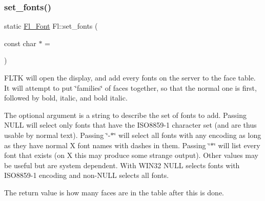 \subsubsection{\texorpdfstring{set\+\_\+fonts()}{set\_fonts()}}
{\footnotesize\ttfamily static \hyperlink{_enumerations_8_h_a2ac46d9f082834b969fffe490a03a709}{Fl\+\_\+\+Font} Fl\+::set\+\_\+fonts (\begin{DoxyParamCaption}\item[{const char $\ast$}]{ = {} }\end{DoxyParamCaption})\hspace{0.3cm}{\ttfamily [static]}}

F\+L\+TK will open the display, and add every fonts on the server to the face table. It will attempt to put \char`\"{}families\char`\"{} of faces together, so that the normal one is first, followed by bold, italic, and bold italic.

The optional argument is a string to describe the set of fonts to add. Passing N\+U\+LL will select only fonts that have the I\+S\+O8859-\/1 character set (and are thus usable by normal text). Passing \char`\"{}-\/$\ast$\char`\"{} will select all fonts with any encoding as long as they have normal X font names with dashes in them. Passing \char`\"{}$\ast$\char`\"{} will list every font that exists (on X this may produce some strange output). Other values may be useful but are system dependent. With W\+I\+N32 N\+U\+LL selects fonts with I\+S\+O8859-\/1 encoding and non-\/\+N\+U\+LL selects all fonts.

The return value is how many faces are in the table after this is done. 